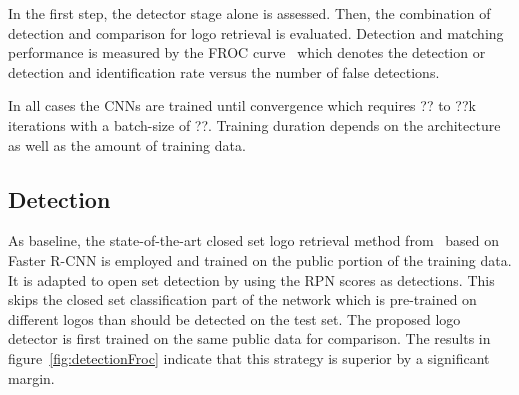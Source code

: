 \documentclass[a4paper,twoside]{article}
\begin{document}
In the first step, the detector stage alone is assessed. Then, the combination of detection and comparison for logo retrieval is evaluated. 
Detection and matching performance is measured by the \ac{FROC} curve~\cite{miller1969} which denotes the detection or detection and identification rate versus the number of false detections.

In all cases the \acp{CNN} are trained until convergence which requires ?? to ??k iterations with a batch-size of ??. Training duration depends on the architecture as well as the amount of training data.

\subsection{Detection}
As baseline, the state-of-the-art closed set logo retrieval method from~\cite{su2016} based on Faster R-CNN is employed and trained on the public portion of the training data.
It is adapted to open set detection by using the RPN scores as detections. This skips the closed set classification part of the network which is pre-trained on different logos than should be detected on the test set.
The proposed logo detector is first trained on the same public data for comparison. The results in figure~\ref{fig:detectionFroc} indicate that this strategy is superior by a significant margin. 
%
\end{document}
